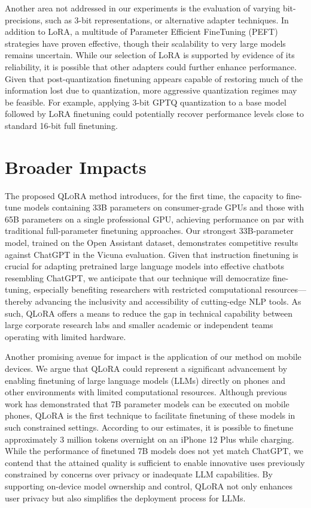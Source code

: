 Another area not addressed in our experiments is the evaluation of varying bit-precisions, such as 3-bit representations, or alternative adapter techniques. In addition to LoRA, a multitude of Parameter Efficient FineTuning (PEFT) strategies have proven effective, though their scalability to very large models remains uncertain. While our selection of LoRA is supported by evidence of its reliability, it is possible that other adapters could further enhance performance. Given that post-quantization finetuning appears capable of restoring much of the information lost due to quantization, more aggressive quantization regimes may be feasible. For example, applying 3-bit GPTQ quantization to a base model followed by LoRA finetuning could potentially recover performance levels close to standard 16-bit full finetuning.

\section{Broader Impacts}

The proposed \textsc{QLoRA} method introduces, for the first time, the capacity to fine-tune models containing 33B parameters on consumer-grade GPUs and those with 65B parameters on a single professional GPU, achieving performance on par with traditional full-parameter finetuning approaches. Our strongest 33B-parameter model, trained on the Open Assistant dataset, demonstrates competitive results against ChatGPT in the Vicuna evaluation. Given that instruction finetuning is crucial for adapting pretrained large language models into effective chatbots resembling ChatGPT, we anticipate that our technique will democratize fine-tuning, especially benefiting researchers with restricted computational resources—thereby advancing the inclusivity and accessibility of cutting-edge NLP tools. As such, \textsc{QLoRA} offers a means to reduce the gap in technical capability between large corporate research labs and smaller academic or independent teams operating with limited hardware.

Another promising avenue for impact is the application of our method on mobile devices. We argue that \textsc{QLoRA} could represent a significant advancement by enabling finetuning of large language models (LLMs) directly on phones and other environments with limited computational resources. Although previous work has demonstrated that 7B parameter models can be executed on mobile phones, \textsc{QLoRA} is the first technique to facilitate finetuning of these models in such constrained settings. According to our estimates, it is possible to finetune approximately 3 million tokens overnight on an iPhone 12 Plus while charging. While the performance of finetuned 7B models does not yet match ChatGPT, we contend that the attained quality is sufficient to enable innovative uses previously constrained by concerns over privacy or inadequate LLM capabilities. By supporting on-device model ownership and control, \textsc{QLoRA} not only enhances user privacy but also simplifies the deployment process for LLMs.

